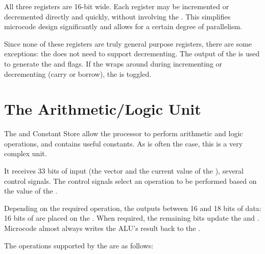 All three registers are 16-bit wide. Each register may be incremented
or decremented directly and quickly, without involving the \ALU. This
simplifies microcode design significantly and allows for a certain
degree of parallelism.

Since none of these registers are truly general purpose registers,
there are some exceptions: the \PC{} does not need to support
decrementing. The output of the \AC{} is used to generate the
\Zreg{} and \Nreg{} flags. If the \AC{} wraps around during
incrementing or decrementing (carry or borrow), the \Lreg{} is
toggled.

\section{The Arithmetic/Logic Unit}
\label{sec:alu}

The \ALU{} and Constant Store allow the processor to perform
arithmetic and logic operations, and contains useful constants. As is
often the case, this is a very complex unit.


It receives 33 bits of input (the \LAC{} vector and the current
value of the \IBUS), several control signals. The control signals
select an operation to be performed based on the value of the \IR.

Depending on the required operation, the \ALU{} outputs between 16 and
18 bits of data: 16 bits of are placed on the \IBUS. When required,
the remaining bits update the \Lreg{} and \Vreg. Microcode almost
always writes the ALU's result back to the \AC{}.

The operations supported by the \ALU{} are as follows:


